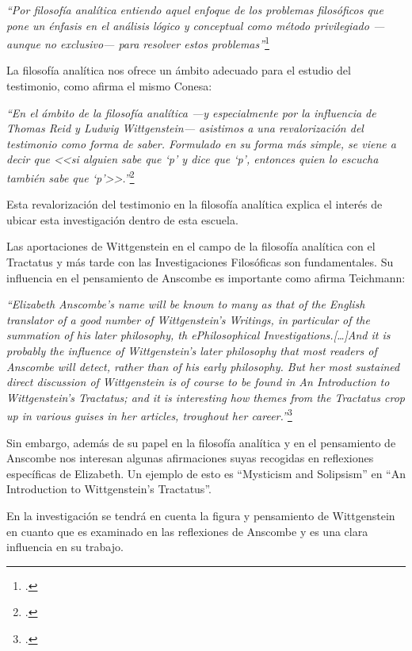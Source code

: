 \documentclass[11pt]{article}
\begin{document}
\emph{
``Por filosofía analítica entiendo aquel enfoque de los problemas filosóficos que pone un énfasis en el análisis lógico y conceptual como método privilegiado \mbox{---aunque} no \mbox{exclusivo---} para resolver estos problemas''}\footcite[16]{cyc}

La filosofía analítica nos ofrece un ámbito adecuado para el estudio del testimonio, como afirma el mismo Conesa:

\emph{
``En el ámbito de la filosofía analítica ---y especialmente por la influencia de Thomas Reid y Ludwig Wittgenstein--- asistimos a una revalorización del testimonio como forma de saber. Formulado en su forma más simple, se viene a decir que <<si alguien sabe que `p' y dice que `p', entonces quien lo escucha también sabe que `p'>>.''}\footcite[487]{feylogicaconesa}

Esta revalorización del testimonio en la filosofía analítica explica el interés de ubicar esta investigación dentro de esta escuela. 

Las aportaciones de Wittgenstein en el campo de la filosofía analítica con el Tractatus y más tarde con las Investigaciones Filosóficas son fundamentales. Su influencia en el pensamiento de Anscombe es importante como afirma Teichmann:

\emph{
``Elizabeth Anscombe's name will be known to many as that of the English translator of a good number of Wittgenstein's Writings, in particular of the summation of his later philosophy, th ePhilosophical Investigations.[\ldots]And it is probably the influence of Wittgenstein's later philosophy that most readers of Anscombe will detect, rather than of his early philosophy. But her most sustained direct discussion of Wittgenstein is of course to be found in An Introduction to Wittgenstein's Tractatus; and it is interesting how themes from the Tractatus crop up in various guises in her articles, troughout her career.''}\footcite[191]{teichmann}

Sin embargo, además de su papel en la filosofía analítica y en el pensamiento de Anscombe nos interesan algunas afirmaciones suyas recogidas en reflexiones específicas de Elizabeth. Un ejemplo de esto es ``Mysticism and Solipsism'' en ``An Introduction to Wittgenstein's Tractatus''.

En la investigación se tendrá en cuenta la figura y pensamiento de Wittgenstein en cuanto que es examinado en las reflexiones de Anscombe y es una clara influencia en su trabajo.
\end{document}
